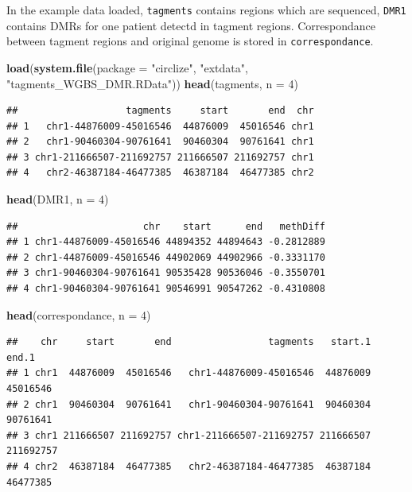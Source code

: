 \documentclass[]{book}
\newenvironment{Shaded}{\begin{snugshade}}{\end{snugshade}}
\newcommand{\KeywordTok}[1]{\textcolor[rgb]{0.13,0.29,0.53}{\textbf{#1}}}
\newcommand{\DataTypeTok}[1]{\textcolor[rgb]{0.13,0.29,0.53}{#1}}
\newcommand{\DecValTok}[1]{\textcolor[rgb]{0.00,0.00,0.81}{#1}}
\newcommand{\StringTok}[1]{\textcolor[rgb]{0.31,0.60,0.02}{#1}}
\newcommand{\NormalTok}[1]{#1}
\begin{document}
In the example data loaded, \texttt{tagments} contains regions which are
sequenced, \texttt{DMR1} contains DMRs for one patient detectd in
tagment regions. Correspondance between tagment regions and original
genome is stored in \texttt{correspondance}.

\begin{Shaded}
\begin{Highlighting}[]
\KeywordTok{load}\NormalTok{(}\KeywordTok{system.file}\NormalTok{(}\DataTypeTok{package =} \StringTok{"circlize"}\NormalTok{, }\StringTok{"extdata"}\NormalTok{, }\StringTok{"tagments_WGBS_DMR.RData"}\NormalTok{))}
\KeywordTok{head}\NormalTok{(tagments, }\DataTypeTok{n =} \DecValTok{4}\NormalTok{)}
\end{Highlighting}
\end{Shaded}

\begin{verbatim}
##                   tagments     start       end  chr
## 1   chr1-44876009-45016546  44876009  45016546 chr1
## 2   chr1-90460304-90761641  90460304  90761641 chr1
## 3 chr1-211666507-211692757 211666507 211692757 chr1
## 4   chr2-46387184-46477385  46387184  46477385 chr2
\end{verbatim}

\begin{Shaded}
\begin{Highlighting}[]
\KeywordTok{head}\NormalTok{(DMR1, }\DataTypeTok{n =} \DecValTok{4}\NormalTok{)}
\end{Highlighting}
\end{Shaded}

\begin{verbatim}
##                      chr    start      end   methDiff
## 1 chr1-44876009-45016546 44894352 44894643 -0.2812889
## 2 chr1-44876009-45016546 44902069 44902966 -0.3331170
## 3 chr1-90460304-90761641 90535428 90536046 -0.3550701
## 4 chr1-90460304-90761641 90546991 90547262 -0.4310808
\end{verbatim}

\begin{Shaded}
\begin{Highlighting}[]
\KeywordTok{head}\NormalTok{(correspondance, }\DataTypeTok{n =} \DecValTok{4}\NormalTok{)}
\end{Highlighting}
\end{Shaded}

\begin{verbatim}
##    chr     start       end                 tagments   start.1     end.1
## 1 chr1  44876009  45016546   chr1-44876009-45016546  44876009  45016546
## 2 chr1  90460304  90761641   chr1-90460304-90761641  90460304  90761641
## 3 chr1 211666507 211692757 chr1-211666507-211692757 211666507 211692757
## 4 chr2  46387184  46477385   chr2-46387184-46477385  46387184  46477385
\end{verbatim}
\end{document}
